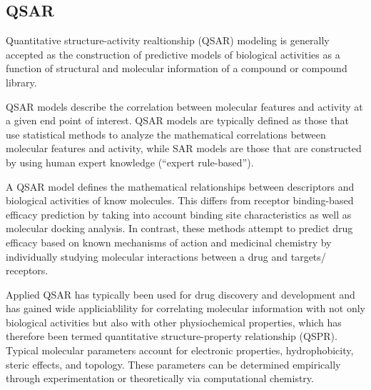 \subsection{QSAR}

Quantitative structure-activity realtionship (QSAR) modeling is generally accepted as the construction of predictive models of biological activities as a function of structural and molecular information of a compound or compound library.\cite{Nantasenamat2009}

QSAR models describe the correlation between molecular features and activity at a given end point of interest. QSAR models are typically defined as those that use statistical methods to analyze the mathematical correlations between molecular features and activity, while SAR models are those that are constructed by using human expert knowledge (“expert rule-based”).

A QSAR model defines the mathematical relationships between descriptors and biological activities of know molecules. This differs from receptor binding-based efficacy prediction by taking into account binding site characteristics as well as molecular docking analysis. In contrast, these methods attempt to predict drug efficacy based on known mechanisms of action and medicinal chemistry by individually studying molecular interactions between a drug and targets/ receptors. \cite{Kruhlak2012}

Applied QSAR has typically been used for drug discovery and development and has gained wide appliciablility for correlating molecular information with not only biological activities but also with other physiochemical properties, which has therefore been termed quantitative structure-property relationship (QSPR). Typical molecular parameters account for electronic properties, hydrophobicity, steric effects, and topology. These parameters can be determined empirically through experimentation or theoretically via computational chemistry. \cite{Nantasenamat2009}



